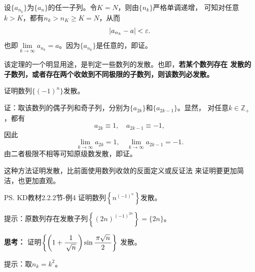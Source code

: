 设$\{a_{n_k}\}$为$\{a_n\}$的任一子列。令$K=N$，则由$\{n_k\}$严格单调递增，
可知对任意$k>K$，都有$n_k>n_K\geq K=N$，从而 
$$|a_{n_k}-a|<\varepsilon.$$
也即$\lim\limits_{k\to\infty}a_{n_k}=a$。因为$\{a_{n_k}\}$是任意的，即证。
\fin

\bs
该定理的一个明显用途，是判定一些数列的发散。也即，{\bf 若某个数列存在
发散的子数列，或者存在两个收敛到不同极限的子数列，则该数列必发散。}

\egz 证明数列$\{(-1)^n\}$发散。

证：取该数列的偶子列和奇子列，分别为$\{a_{2k}\}$和$\{a_{2k-1}\}$。显然，
对任意$k\in\mathbb{Z}_+$，都有
$$a_{2k}\equiv 1,\quad a_{2k-1}\equiv -1,$$
因此
$$\lim\limits_{k\to\infty}a_{2k}=1,\quad
\lim\limits_{k\to\infty}a_{2k-1}=-1.$$
由二者极限不相等可知原级数发散，即证。\fin

这种方法证明发散，比前面使用数列收敛的反面定义或反证法
来证明要更加简洁，也更加直观。

\bs
\egz \ps{KD教材2.2.2节-例4}
证明数列$\left\{n^{(-1)^n}\right\}$发散。

提示：原数列存在发散子列$\left\{(2n)^{(-1)^{2n}}\right\}=\{2n\}$。

\bs
{\bf 思考：} 证明$\left\{\left(1+\displaystyle\frac{\,{1}\,}{\,{\sqrt n}\,}\right)
\sin\displaystyle\frac{\,{\pi\sqrt n}\,}{\,{2}\,}\right\}$
发散。

\ifhint
提示：取$n_k=k^2$。 
\fi

